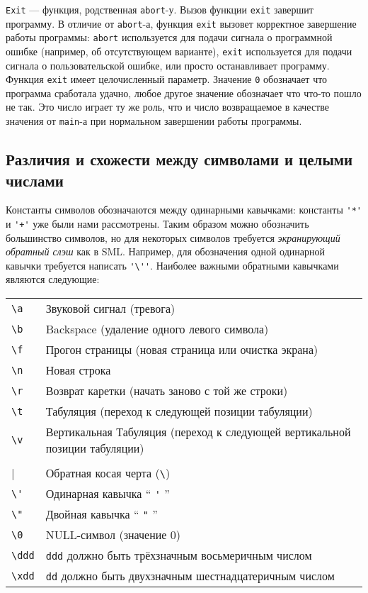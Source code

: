 \lstinline|Exit| --- функция, родственная \lstinline|abort|-у. Вызов функции \lstinline|exit| завершит программу. В отличие от \lstinline|abort|-а, функция \lstinline|exit| вызовет корректное завершение работы программы: \lstinline|abort| используется для подачи сигнала о программной ошибке (например, об отсутствующем варианте), \lstinline|exit| используется для подачи сигнала о пользовательской ошибке, или просто останавливает программу. Функция \lstinline|exit| имеет целочисленный параметр. Значение \lstinline|0| обозначает что программа сработала удачно, любое другое значение обозначает что что-то пошло не так. Это число играет ту же роль, что и число возвращаемое в качестве значения от \lstinline|main|-а при нормальном завершении работы программы.

\subsection{Различия и схожести между символами и целыми числами}\label{CharacterIntegerDiffSim}

Константы символов обозначаются между одинарными кавычками: константы \lstinline|'*'| и \lstinline|'+'| уже были нами рассмотрены. Таким образом можно обозначить большинство символов, но для некоторых символов требуется \emph{экранирующий обратный слэш} как в SML. Например, для обозначения одной одинарной кавычки требуется написать \lstinline|'\''|. Наиболее важными обратными кавычками являются следующие:

\begin{longtable}{l|p{11cm}}
\lstinline|\a| & Звуковой сигнал (тревога) \\
\lstinline|\b| & Backspace (удаление одного левого символа) \\
\lstinline|\f| & Прогон страницы (новая страница или очистка экрана) \\
\lstinline|\n| & Новая строка \\
\lstinline|\r| & Возврат каретки (начать заново с той же строки) \\
\lstinline|\t| & Табуляция (переход к следующей позиции табуляции) \\
\lstinline|\v| & Вертикальная Табуляция (переход к следующей вертикальной позиции табуляции) \\
\lstinline|\\| & Обратная косая черта (\lstinline|\|) \\
\lstinline|\'| & Одинарная кавычка `` \lstinline|'| '' \\
\lstinline|\"| & Двойная кавычка `` \lstinline|"| '' \\
\lstinline|\0| & NULL-символ (значение 0) \\
\lstinline|\ddd| & \lstinline|ddd| должно быть трёхзначным восьмеричным числом \\
\lstinline|\xdd| & \lstinline|dd| должно быть двухзначным шестнадцатеричным числом 
\end{longtable}

